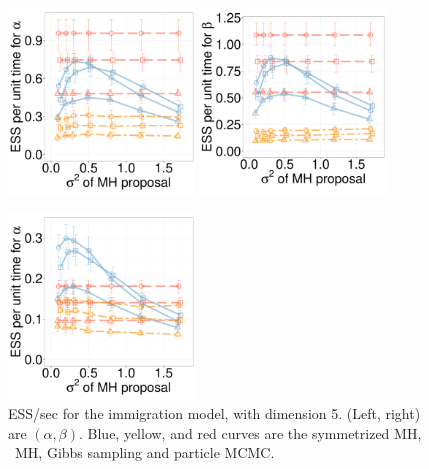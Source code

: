 \begin{figure}[H]
 \begin{minipage}[hp]{0.65\linewidth}
  \centering
    \includegraphics [width=0.44\textwidth, angle=0]{figs/new_whole_exp_figs/q_alpha_dim10.pdf}
    \includegraphics [width=0.44\textwidth, angle=0]{figs/new_whole_exp_figs/q_beta_dim10.pdf}
  \end{minipage}
  \begin{minipage}[!hp]{0.33\linewidth}
    \caption{ESS/sec for the immigration model, with dimension 5. (Left, 
      right) are $(\alpha, \beta)$. Blue, yellow, and red curves are the symmetrized MH,
  \naive\ MH, Gibbs sampling and particle MCMC.}
     \label{fig:ESS_Q_D1010}
  \end{minipage}
  \centering
  \begin{minipage}[!hp]{0.65\linewidth}
  \centering
    \includegraphics [width=0.44\textwidth, angle=0]{figs/new_whole_exp_figs/cq_alpha_dim10.pdf}

\end{minipage}
\end{figure}
